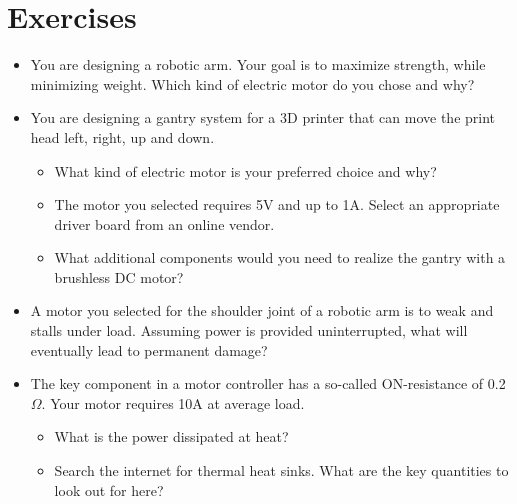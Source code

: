 \section{Exercises}
\begin{itemize}
\item You are designing a robotic arm. Your goal is to maximize strength, while minimizing weight. Which kind of electric motor do you chose and why?
\item You are designing a gantry system for a 3D printer that can move the print head left, right, up and down.
\begin{itemize}
\item What kind of electric motor is your preferred choice and why?
\item The motor you selected requires 5V and up to 1A. Select an appropriate driver board from an online vendor.
\item What additional components would you need to realize the gantry with a brushless DC motor?
\end{itemize}
\item A motor you selected for the shoulder joint of a robotic arm is to weak and stalls under load. Assuming power is provided uninterrupted, what will eventually lead to permanent damage?
\item The key component in a motor controller has a so-called ON-resistance of 0.2$\Omega$. Your motor requires 10A at average load.
\begin{itemize}
\item What is the power dissipated at heat?
\item Search the internet for thermal heat sinks. What are the key quantities to look out for here?
\end{itemize}
\end{itemize}
